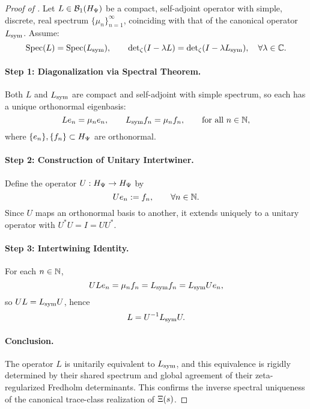 \begin{proof}[Proof of ]
Let \( L \in \mathcal{B}_1(H_{\Psi}) \) be a compact, self-adjoint operator with simple, discrete, real spectrum \( \{ \mu_n \}_{n=1}^\infty \), coinciding with that of the canonical operator \( L_{\mathrm{sym}} \). Assume:
\[
\operatorname{Spec}(L) = \operatorname{Spec}(L_{\mathrm{sym}}), \qquad
\det\nolimits_\zeta(I - \lambda L) = \det\nolimits_\zeta(I - \lambda L_{\mathrm{sym}}), \quad \forall \lambda \in \mathbb{C}.
\]

\paragraph{Step 1: Diagonalization via Spectral Theorem.}
Both \( L \) and \( L_{\mathrm{sym}} \) are compact and self-adjoint with simple spectrum, so each has a unique orthonormal eigenbasis:
\[
L e_n = \mu_n e_n, \qquad L_{\mathrm{sym}} f_n = \mu_n f_n, \qquad \text{for all } n \in \mathbb{N},
\]
where \( \{e_n\}, \{f_n\} \subset H_{\Psi} \) are orthonormal.

\paragraph{Step 2: Construction of Unitary Intertwiner.}
Define the operator \( U : H_{\Psi} \to H_{\Psi} \) by
\[
U e_n := f_n, \qquad \forall n \in \mathbb{N}.
\]
Since \( U \) maps an orthonormal basis to another, it extends uniquely to a unitary operator with \( U^* U = I = UU^* \).

\paragraph{Step 3: Intertwining Identity.}
For each \( n \in \mathbb{N} \),
\[
U L e_n = \mu_n f_n = L_{\mathrm{sym}} f_n = L_{\mathrm{sym}} U e_n,
\]
so \( U L = L_{\mathrm{sym}} U \), hence
\[
L = U^{-1} L_{\mathrm{sym}} U.
\]

\paragraph{Conclusion.}
The operator \( L \) is unitarily equivalent to \( L_{\mathrm{sym}} \), and this equivalence is rigidly determined by their shared spectrum and global agreement of their zeta-regularized Fredholm determinants. This confirms the inverse spectral uniqueness of the canonical trace-class realization of \( \Xi(s) \).
\end{proof}
